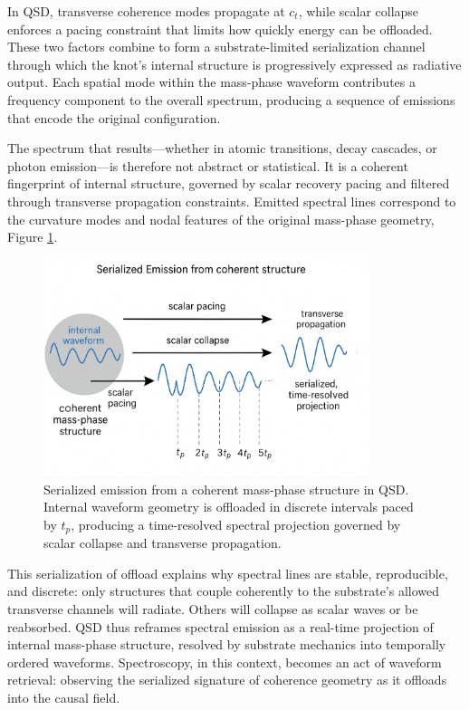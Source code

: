 \documentclass[entropy,article,submit,pdftex,moreauthors]{Definitions/mdpi}
\begin{document}
In QSD, transverse coherence modes propagate at \texorpdfstring{\( c_t \)}{ct}, while scalar collapse enforces a pacing constraint that limits how quickly energy can be offloaded. These two factors combine to form a substrate-limited serialization channel through which the knot's internal structure is progressively expressed as radiative output. Each spatial mode within the mass-phase waveform contributes a frequency component to the overall spectrum, producing a sequence of emissions that encode the original configuration.

The spectrum that results—whether in atomic transitions, decay cascades, or photon emission—is therefore not abstract or statistical. It is a coherent fingerprint of internal structure, governed by scalar recovery pacing and filtered through transverse propagation constraints. Emitted spectral lines correspond to the curvature modes and nodal features of the original mass-phase geometry, Figure \ref{fig:spectral}.

\begin{figure}[htbp]
\centering
\includegraphics[width=0.85\textwidth]{figures/spectral.pdf}
\caption{Serialized emission from a coherent mass-phase structure in QSD. Internal waveform geometry is offloaded in discrete intervals paced by \( t_p \), producing a time-resolved spectral projection governed by scalar collapse and transverse propagation.}

\label{fig:spectral}
\end{figure}

This serialization of offload explains why spectral lines are stable, reproducible, and discrete: only structures that couple coherently to the substrate’s allowed transverse channels will radiate. Others will collapse as scalar waves or be reabsorbed. QSD thus reframes spectral emission as a real-time projection of internal mass-phase structure, resolved by substrate mechanics into temporally ordered waveforms. Spectroscopy, in this context, becomes an act of waveform retrieval: observing the serialized signature of coherence geometry as it offloads into the causal field.
\end{document}
